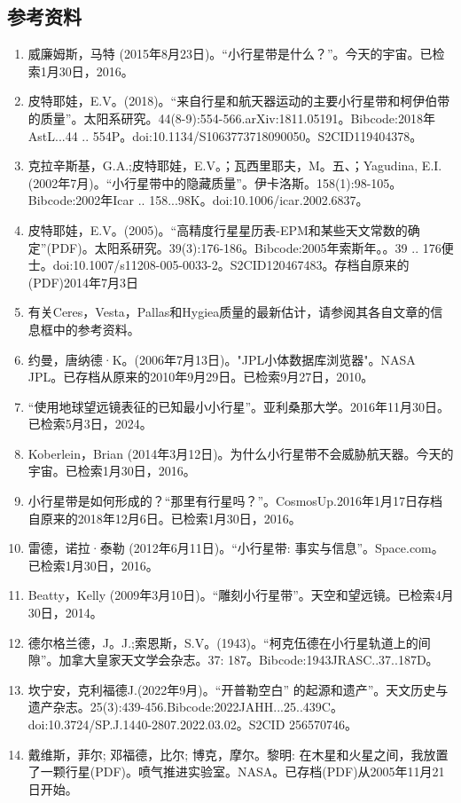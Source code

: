\subsection{参考资料}
\begin{enumerate}
\item 威廉姆斯，马特 (2015年8月23日)。“小行星带是什么？”。今天的宇宙。已检索1月30日，2016。
\item 皮特耶娃，E.V。(2018)。“来自行星和航天器运动的主要小行星带和柯伊伯带的质量”。太阳系研究。44(8-9):554-566.arXiv:1811.05191。Bibcode:2018年AstL...44 .. 554P。doi:10.1134/S1063773718090050。S2CID119404378。 
\item 克拉辛斯基，G.A.;皮特耶娃，E.V。；瓦西里耶夫，M。五、；Yagudina, E.I.(2002年7月)。“小行星带中的隐藏质量”。伊卡洛斯。158(1):98-105。Bibcode:2002年Icar .. 158...98K。doi:10.1006/icar.2002.6837。
\item 皮特耶娃，E.V。(2005)。“高精度行星星历表-EPM和某些天文常数的确定”(PDF)。太阳系研究。39(3):176-186。Bibcode:2005年索斯年。。39 .. 176便士。doi:10.1007/s11208-005-0033-2。S2CID120467483。存档自原来的(PDF)2014年7月3日  
\item 有关Ceres，Vesta，Pallas和Hygiea质量的最新估计，请参阅其各自文章的信息框中的参考资料。
\item 约曼，唐纳德·K。(2006年7月13日)。"JPL小体数据库浏览器"。NASA JPL。已存档从原来的2010年9月29日。已检索9月27日，2010。
\item “使用地球望远镜表征的已知最小小行星”。亚利桑那大学。2016年11月30日。已检索5月3日，2024。
\item Koberlein，Brian (2014年3月12日)。为什么小行星带不会威胁航天器。今天的宇宙。已检索1月30日，2016。
\item 小行星带是如何形成的？“那里有行星吗？”。CosmosUp.2016年1月17日存档自原来的2018年12月6日。已检索1月30日，2016。
\item 雷德，诺拉·泰勒 (2012年6月11日)。“小行星带: 事实与信息”。Space.com。已检索1月30日，2016。
\item Beatty，Kelly (2009年3月10日)。“雕刻小行星带”。天空和望远镜。已检索4月30日，2014。
\item 德尔格兰德，J。J.;索恩斯，S.V。(1943)。“柯克伍德在小行星轨道上的间隙”。加拿大皇家天文学会杂志。37: 187。Bibcode:1943JRASC..37..187D。
\item 坎宁安，克利福德J.(2022年9月)。“开普勒空白” 的起源和遗产”。天文历史与遗产杂志。25(3):439-456.Bibcode:2022JAHH...25..439C。doi:10.3724/SP.J.1440-2807.2022.03.02。S2CID 256570746。
\item 戴维斯，菲尔; 邓福德，比尔; 博克，摩尔。黎明: 在木星和火星之间，我放置了一颗行星(PDF)。喷气推进实验室。NASA。已存档(PDF)从2005年11月21日开始。

\end{enumerate}
